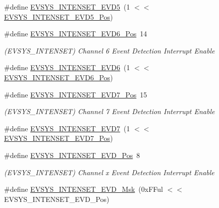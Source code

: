 \begin{DoxyCompactItemize}
\#define \mbox{\hyperlink{group___s_a_m_d21___e_v_s_y_s_gab3b2300602dd862366cef7a2bcfce2f7}{E\+V\+S\+Y\+S\+\_\+\+I\+N\+T\+E\+N\+S\+E\+T\+\_\+\+E\+V\+D5}}~(1 $<$$<$ \mbox{\hyperlink{group___s_a_m_d21___e_v_s_y_s_ga42062ac94bf286d862f9d7f979032380}{E\+V\+S\+Y\+S\+\_\+\+I\+N\+T\+E\+N\+S\+E\+T\+\_\+\+E\+V\+D5\+\_\+\+Pos}})
\item 
\#define \mbox{\hyperlink{group___s_a_m_d21___e_v_s_y_s_ga74bcfeecac2b6a63942c70384bbf93c9}{E\+V\+S\+Y\+S\+\_\+\+I\+N\+T\+E\+N\+S\+E\+T\+\_\+\+E\+V\+D6\+\_\+\+Pos}}~14
\begin{DoxyCompactList}\small\item\em (E\+V\+S\+Y\+S\+\_\+\+I\+N\+T\+E\+N\+S\+ET) Channel 6 Event Detection Interrupt Enable \end{DoxyCompactList}\item 
\#define \mbox{\hyperlink{group___s_a_m_d21___e_v_s_y_s_ga5ba66c728a065f72b41a00d46072543c}{E\+V\+S\+Y\+S\+\_\+\+I\+N\+T\+E\+N\+S\+E\+T\+\_\+\+E\+V\+D6}}~(1 $<$$<$ \mbox{\hyperlink{group___s_a_m_d21___e_v_s_y_s_ga74bcfeecac2b6a63942c70384bbf93c9}{E\+V\+S\+Y\+S\+\_\+\+I\+N\+T\+E\+N\+S\+E\+T\+\_\+\+E\+V\+D6\+\_\+\+Pos}})
\item 
\#define \mbox{\hyperlink{group___s_a_m_d21___e_v_s_y_s_ga6e76acb48a65a547fd7cdd6190b4dd37}{E\+V\+S\+Y\+S\+\_\+\+I\+N\+T\+E\+N\+S\+E\+T\+\_\+\+E\+V\+D7\+\_\+\+Pos}}~15
\begin{DoxyCompactList}\small\item\em (E\+V\+S\+Y\+S\+\_\+\+I\+N\+T\+E\+N\+S\+ET) Channel 7 Event Detection Interrupt Enable \end{DoxyCompactList}\item 
\#define \mbox{\hyperlink{group___s_a_m_d21___e_v_s_y_s_gafda5b44a342446c9f4d74f59cdb44818}{E\+V\+S\+Y\+S\+\_\+\+I\+N\+T\+E\+N\+S\+E\+T\+\_\+\+E\+V\+D7}}~(1 $<$$<$ \mbox{\hyperlink{group___s_a_m_d21___e_v_s_y_s_ga6e76acb48a65a547fd7cdd6190b4dd37}{E\+V\+S\+Y\+S\+\_\+\+I\+N\+T\+E\+N\+S\+E\+T\+\_\+\+E\+V\+D7\+\_\+\+Pos}})
\item 
\#define \mbox{\hyperlink{group___s_a_m_d21___e_v_s_y_s_ga0b9e0e6564aadc19f81955941877a3a7}{E\+V\+S\+Y\+S\+\_\+\+I\+N\+T\+E\+N\+S\+E\+T\+\_\+\+E\+V\+D\+\_\+\+Pos}}~8
\begin{DoxyCompactList}\small\item\em (E\+V\+S\+Y\+S\+\_\+\+I\+N\+T\+E\+N\+S\+ET) Channel x Event Detection Interrupt Enable \end{DoxyCompactList}\item 
\#define \mbox{\hyperlink{group___s_a_m_d21___e_v_s_y_s_gae62892a13725d99783475ce3b4bfb043}{E\+V\+S\+Y\+S\+\_\+\+I\+N\+T\+E\+N\+S\+E\+T\+\_\+\+E\+V\+D\+\_\+\+Msk}}~(0x\+F\+Ful $<$$<$ E\+V\+S\+Y\+S\+\_\+\+I\+N\+T\+E\+N\+S\+E\+T\+\_\+\+E\+V\+D\+\_\+\+Pos)

\end{DoxyCompactItemize}
